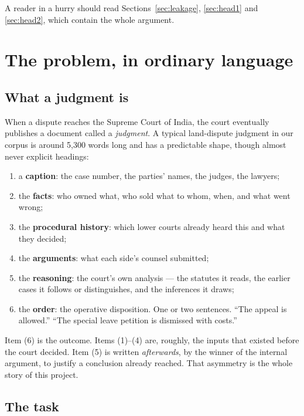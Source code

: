 \documentclass[12pt,a4paper]{article}
\begin{document}
A reader in a hurry should read Sections~\ref{sec:leakage}, \ref{sec:head1} and \ref{sec:head2},
which contain the whole argument.

\section{The problem, in ordinary language}\label{sec:problem}

\subsection{What a judgment is}

When a dispute reaches the Supreme Court of India, the court eventually publishes a document called
a \emph{judgment}. A typical land-dispute judgment in our corpus is around 5,300 words long and has
a predictable shape, though almost never explicit headings:

\begin{enumerate}[label=(\arabic*)]
\item a \textbf{caption}: the case number, the parties' names, the judges, the lawyers;
\item the \textbf{facts}: who owned what, who sold what to whom, when, and what went wrong;
\item the \textbf{procedural history}: which lower courts already heard this and what they decided;
\item the \textbf{arguments}: what each side's counsel submitted;
\item the \textbf{reasoning}: the court's own analysis --- the statutes it reads, the earlier cases
      it follows or distinguishes, and the inferences it draws;
\item the \textbf{order}: the operative disposition. One or two sentences. ``The appeal is
      allowed.'' ``The special leave petition is dismissed with costs.''
\end{enumerate}

Item (6) is the outcome. Items (1)--(4) are, roughly, the inputs that existed before the court
decided. Item (5) is written \emph{afterwards}, by the winner of the internal argument, to justify
a conclusion already reached. That asymmetry is the whole story of this project.

\subsection{The task}
\end{document}
